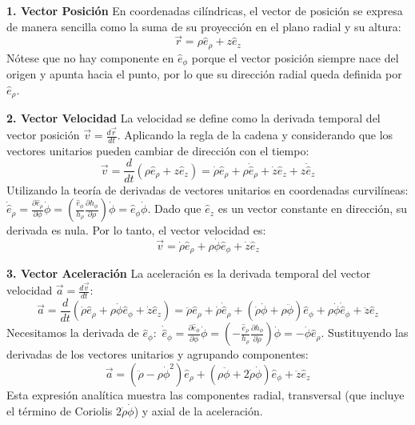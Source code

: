\documentclass[a4paper]{article}
\begin{document}
\textbf{1. Vector Posición}
En coordenadas cilíndricas, el vector de posición se expresa de manera sencilla como la suma de su proyección en el plano radial y su altura:
\begin{equation}
\vec{r} = \rho \hat{e}_\rho + z \hat{e}_z
\end{equation}
Nótese que no hay componente en $\hat{e}_\phi$ porque el vector posición siempre nace del origen y apunta hacia el punto, por lo que su dirección radial queda definida por $\hat{e}_\rho.$

\textbf{2. Vector Velocidad}
La velocidad se define como la derivada temporal del vector posición $\vec{v} = \frac{d\vec{r}}{dt}.$ Aplicando la regla de la cadena y considerando que los vectores unitarios pueden cambiar de dirección con el tiempo:
\begin{equation}
\vec{v} = \frac{d}{dt} (\rho \hat{e}_\rho + z \hat{e}_z) = \dot{\rho} \hat{e}_\rho + \rho \dot{\hat{e}}_\rho + \dot{z} \hat{e}_z + z \dot{\hat{e}}_z
\end{equation}
Utilizando la teoría de derivadas de vectores unitarios en coordenadas curvilíneas:
$\dot{\hat{e}}_\rho = \frac{\partial \hat{e}_\rho}{\partial \phi} \dot{\phi} = \left( \frac{\hat{e}_\phi}{h_\rho} \frac{\partial h_\phi}{\partial \rho} \right) \dot{\phi} = \hat{e}_\phi \dot{\phi}.$
Dado que $\hat{e}_z$ es un vector constante en dirección, su derivada es nula. Por lo tanto, el vector velocidad es:
\begin{equation}
\vec{v} = \dot{\rho} \hat{e}_\rho + \rho \dot{\phi} \hat{e}_\phi + \dot{z} \hat{e}_z
\end{equation}

\textbf{3. Vector Aceleración}
La aceleración es la derivada temporal del vector velocidad $\vec{a} = \frac{d\vec{v}}{dt}:$
\begin{equation}
\vec{a} = \frac{d}{dt} (\dot{\rho} \hat{e}_\rho + \rho \dot{\phi} \hat{e}_\phi + \dot{z} \hat{e}_z) = \ddot{\rho} \hat{e}_\rho + \dot{\rho} \dot{\hat{e}}_\rho + (\dot{\rho} \dot{\phi} + \rho \ddot{\phi}) \hat{e}_\phi + \rho \dot{\phi} \dot{\hat{e}}_\phi + \ddot{z} \hat{e}_z
\end{equation}
Necesitamos la derivada de $\hat{e}_\phi:$
$\dot{\hat{e}}_\phi = \frac{\partial \hat{e}_\phi}{\partial \phi} \dot{\phi} = \left( -\frac{\hat{e}_\rho}{h_\rho} \frac{\partial h_\phi}{\partial \rho} \right) \dot{\phi} = -\dot{\phi} \hat{e}_\rho.$
Sustituyendo las derivadas de los vectores unitarios y agrupando componentes:
\begin{equation}
\vec{a} = (\ddot{\rho} - \rho \dot{\phi}^2) \hat{e}_\rho + (\rho \ddot{\phi} + 2 \dot{\rho} \dot{\phi}) \hat{e}_\phi + \ddot{z} \hat{e}_z
\end{equation}
Esta expresión analítica muestra las componentes radial, transversal (que incluye el término de Coriolis $2\dot{\rho}\dot{\phi}$) y axial de la aceleración.
\end{document}
